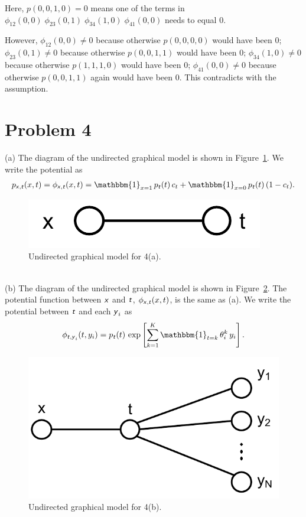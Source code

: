 \documentclass{article}
\newcommand{\s}[1]{\textsf{\textit{#1}}}
\newcommand{\qeds}{\hfill\qedsymbol}
\begin{document}
Here, $p(0, 0, 1, 0) = 0$ means one of the terms in $\phi_{12}(0,0)\;\phi_{23}(0,1)\;\phi_{34}(1,0)\;\phi_{41}(0,0)$ needs to equal $0$.

However,
$\phi_{12}(0,0) \neq 0$ because otherwise $p(0, 0, 0, 0)$ would have been $0$;
$\phi_{23}(0,1) \neq 0$ because otherwise $p(0, 0, 1, 1)$ would have been $0$;
$\phi_{34}(1,0) \neq 0$ because otherwise $p(1, 1, 1, 0)$ would have been $0$;
$\phi_{41}(0,0) \neq 0$ because otherwise $p(0, 0, 1, 1)$ again would have been $0$.
This contradicts with the assumption. \qeds
\pagebreak


\section*{Problem 4}
(a) The diagram of the undirected graphical model is shown in Figure~\ref{f:4a}.
We write the potential as
\begin{align*}
p_{\s{x}, \s{t}}(x, t) = \phi_{\s{x}, \s{t}}(x, t) = \mathbbm{1}_{x=1}\,p_{\s{t}}(t)\,c_t + \mathbbm{1}_{x=0}\,p_{\s{t}}(t)\,(1 - c_t).
\end{align*}
\begin{figure}[h]
  \centering
  \includegraphics[width=0.2\columnwidth]{4a.pdf}
  \caption{Undirected graphical model for 4(a).}
  \label{f:4a}
\end{figure}
\\

%
\noindent
(b) The diagram of the undirected graphical model is shown in Figure~\ref{f:4b}.
The potential function between $\s{x}$ and $\s{t}$, $\phi_{\s{x}, \s{t}}(x, t)$,
is the same as (a).
We write the potential between $\s{t}$ and each $\s{y}_i$ as
\begin{align*}
\phi_{\s{t}, \s{y}_i}(t, y_i) = p_{\s{t}}(t)\,\exp\left[\sum_{k=1}^K\mathbbm{1}_{t=k}\,\theta_i^k\,y_i\right].
\end{align*}

\begin{figure}[h]
  \centering
  \includegraphics[width=0.3\columnwidth]{4b.pdf}
  \caption{Undirected graphical model for 4(b).}
  \label{f:4b}
\end{figure}
\end{document}
